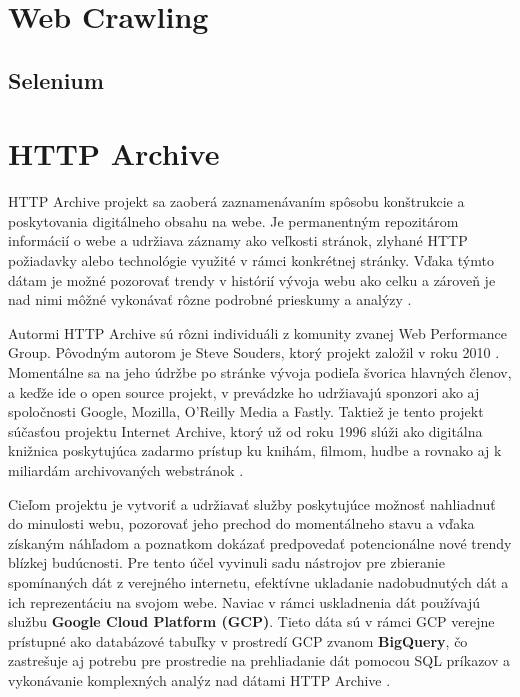 \section{Web Crawling}
\label{web-crawling}


\subsection{Selenium}
\label{selenium}


\section{HTTP Archive}
\label{httparchive}

HTTP Archive projekt sa zaoberá zaznamenávaním spôsobu konštrukcie a poskytovania digitálneho obsahu na webe. Je permanentným repozitárom informácií o webe a udržiava záznamy ako veľkosti
stránok, zlyhané HTTP požiadavky alebo technológie využité v rámci konkrétnej stránky. Vďaka týmto dátam je možné pozorovať trendy v histórií vývoja webu ako celku a zároveň je nad nimi môžné vykonávať
rôzne podrobné prieskumy a analýzy \cite{httparchive-about}. 

Autormi HTTP Archive sú rôzni individuáli z komunity zvanej Web Performance Group. Pôvodným autorom je Steve Souders, ktorý projekt založil v roku 2010 \cite{httparchive-faq}.
Momentálne sa na jeho údržbe po stránke vývoja podieľa švorica hlavných členov, a keďže ide o open source projekt, v prevádzke ho udržiavajú sponzori ako aj spoločnosti Google, Mozilla, O'Reilly Media a Fastly.
Taktiež je tento projekt súčasťou projektu Internet Archive, ktorý už od roku 1996 slúži ako digitálna knižnica poskytujúca zadarmo prístup ku knihám, filmom, hudbe a rovnako aj k miliardám archivovaných webstránok \cite{httparchive-about}.

Cieľom projektu je vytvoriť a udržiavať služby poskytujúce možnosť nahliadnuť do minulosti webu, pozorovať jeho prechod do momentálneho stavu a vďaka získaným náhľadom a poznatkom dokázať
predpovedať potencionálne nové trendy blízkej budúcnosti. 
Pre tento účel vyvinuli sadu nástrojov pre zbieranie spomínaných dát z verejného internetu, efektívne ukladanie nadobudnutých dát a ich reprezentáciu na svojom webe.
Naviac v rámci uskladnenia dát používajú službu \textbf{Google Cloud Platform (GCP)}.
Tieto dáta sú v rámci GCP verejne prístupné ako databázové tabuľky v prostredí GCP zvanom \textbf{BigQuery}, čo zastrešuje aj potrebu pre prostredie na prehliadanie dát pomocou SQL príkazov 
a vykonávanie komplexných analýz nad dátami HTTP Archive \cite{httparchive-faq}. 

